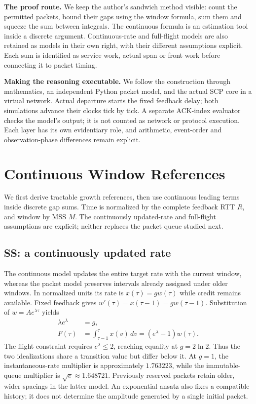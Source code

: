 \documentclass[sigconf,nonacm]{acmart}
\begin{document}
\textbf{The proof route.} We keep the author's sandwich method visible:
count the permitted packets, bound their gaps using the window formula,
sum them and squeeze the sum between integrals. The continuous formula is
an estimation tool inside a discrete argument. Continuous-rate and
full-flight models are also retained as models in their own right, with
their different assumptions explicit. Each sum is identified as service
work, actual span or front work before connecting it to packet timing.

\textbf{Making the reasoning executable.} We follow the construction through mathematics, an independent Python packet model, and the actual SCP core in a virtual network. Actual departure starts the fixed feedback delay; both simulations advance their clocks tick by tick. A separate ACK-index evaluator checks the model's output; it is not counted as network or protocol execution. Each layer has its own evidentiary role, and arithmetic, event-order and observation-phase differences remain explicit.

\section{Continuous Window References}
We first derive tractable growth references, then use continuous leading
terms inside discrete gap sums. Time is normalized by the complete
feedback RTT $R$, and window by MSS $M$. The continuously updated-rate
and full-flight assumptions are explicit; neither replaces the packet
queue studied next.

\subsection{SS: a continuously updated rate}\label{sec:ssfluid}
The continuous model updates the entire target rate with the current window,
whereas the packet model preserves intervals already assigned under older
windows. In normalized units its rate is $x(\tau)=gw(\tau)$ while credit
remains available. Fixed feedback gives $w'(\tau)=x(\tau-1)=gw(\tau-1)$.
Substitution of $w=Ae^{\lambda\tau}$ yields
\begin{equation}
\begin{aligned}
 \lambda e^\lambda&=g,\\
 F(\tau)&=\int_{\tau-1}^{\tau}x(v)\,dv=(e^\lambda-1)w(\tau).
\end{aligned}
\end{equation}
The flight constraint requires $e^\lambda\le2$, reaching equality at $g=2\ln2$. Thus the two idealizations share a transition value but differ below it. At $g=1$, the instantaneous-rate multiplier is approximately $1.763223$, while the immutable-queue multiplier is $\sqrt e\approx1.648721$. Previously reserved packets retain older, wider spacings in the latter model. An exponential ansatz also fixes a compatible history; it does not determine the amplitude generated by a single initial packet.
\end{document}
